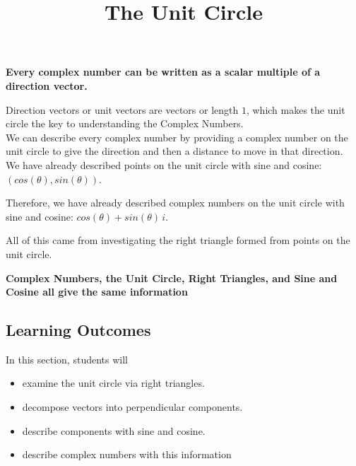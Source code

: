 \documentclass{ximera}
\title{The Unit Circle}
\begin{document}
\begin{abstract}
\end{abstract}
\maketitle




\begin{center}
\textbf{\textcolor{red!80!black}{Every complex number can be written as a scalar multiple of a direction vector.}}
\end{center}






Direction vectors or unit vectors are vectors or length $1$, which makes the unit circle the key to understanding the Complex Numbers. \\ 



We can describe every complex number by providing a complex number on the unit circle to give the direction and then a distance to move in that direction.  \\ 

We have already described points on the unit circle with sine and cosine: $(cos(\theta), sin(\theta))$. 

Therefore, we have already described complex numbers on the unit circle with sine and cosine: $cos(\theta) + sin(\theta) \, i$.  


All of this came from investigating the right triangle formed from points on the unit circle. \\



\begin{center}
\textbf{\textcolor{purple!85!blue}{Complex Numbers, the Unit Circle, Right Triangles, and Sine and Cosine all give the same information}}
\end{center}









\subsection{Learning Outcomes}


\begin{sectionOutcomes}
In this section, students will 

\begin{itemize}
\item examine the unit circle via right triangles.
\item decompose vectors into perpendicular components.
\item describe components with sine and cosine.
\item describe complex numbers with this information
\end{itemize}
\end{sectionOutcomes}
\end{document}
